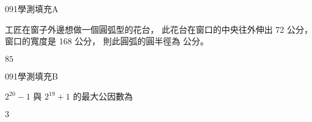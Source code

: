 \begin{QUESTIONS}
    \begin{QUESTION}
        \begin{ExamInfo}{091}{學測}{填充}{A}
        \end{ExamInfo}
        \begin{ExamAnsRateInfo}{28}{65}{17}{2}
        \end{ExamAnsRateInfo}
        \begin{QBODY}
            工匠在窗子外邊想做一個圓弧型的花台，
            此花台在窗口的中央往外伸出 72 公分，
            窗口的寬度是 168 公分，
            則此圓弧的圓半徑為 
            \TCNBOX{\TCN\TCN} 公分。
        \end{QBODY}
        \begin{QFROMS}
        \end{QFROMS}
        \begin{QTAGS}\end{QTAGS}
        \begin{QANS}
            $85$
        \end{QANS}
        \begin{QSOLLIST}
        \end{QSOLLIST}
        \begin{QEMPTYSPACE}
        \end{QEMPTYSPACE}
    \end{QUESTION}
    \begin{QUESTION}
        \begin{ExamInfo}{091}{學測}{填充}{B}
        \end{ExamInfo}
        \begin{ExamAnsRateInfo}{50}{70}{51}{29}
        \end{ExamAnsRateInfo}
        \begin{QBODY}
            $2^{20}-1$ 與 $2^{19}+1$ 的最大公因數為 
            \TCNBOX{\TCN}
        \end{QBODY}
        \begin{QFROMS}
        \end{QFROMS}
        \begin{QTAGS}\end{QTAGS}
        \begin{QANS}
            $3$
        \end{QANS}
        \begin{QSOLLIST}
        \end{QSOLLIST}
        \begin{QEMPTYSPACE}

\end{QEMPTYSPACE}
\end{QUESTION}
\end{QUESTIONS}
